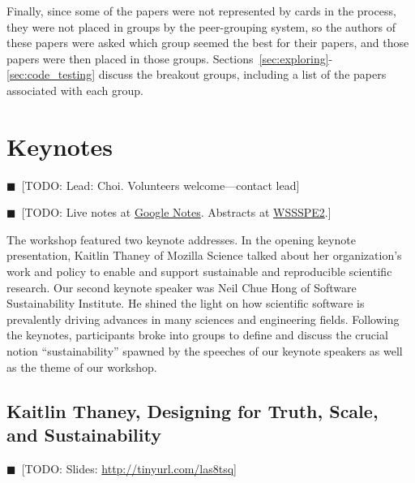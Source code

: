 \documentclass[11pt, oneside]{amsart}
\newcommand{\todo}[1]{{\color{blue}$\blacksquare$~\textsf{[TODO: #1]}}}
\begin{document}
Finally, since some of the papers were not represented by cards in the process,
they were not placed in groups by the peer-grouping system, so the authors of
these papers were asked which group seemed the best for their papers, and those
papers were then placed in those groups. Sections~\ref{sec:exploring}-\ref{sec:code_testing}
discuss the breakout groups, including a list of the papers associated with each
group.


\section{Keynotes} \label{sec:keynotes}
\todo{Lead: Choi. Volunteers welcome---contact lead}

\todo{Live notes at \href{http://tinyurl.com/q6ew45v}{Google Notes}.
Abstracts at \href{http://tinyurl.com/mnenzms}{WSSSPE2}.}

The workshop featured two keynote addresses. In the opening keynote
presentation, Kaitlin Thaney of Mozilla Science talked about her organization's
work and policy to enable and support sustainable and reproducible scientific
research. Our second keynote speaker was Neil Chue Hong of Software
Sustainability Institute. He shined the light on how scientific software is
prevalently driving advances in many sciences and engineering fields. Following
the keynotes, participants broke into groups to define and discuss the crucial
notion ``sustainability'' spawned by the speeches of our keynote speakers as well
as the theme of our workshop.
  	 

\subsection{Kaitlin Thaney, Designing for Truth, Scale, and Sustainability}
\label{keynote1}

\todo{Slides: \url{http://tinyurl.com/las8tsq}}
\end{document}

